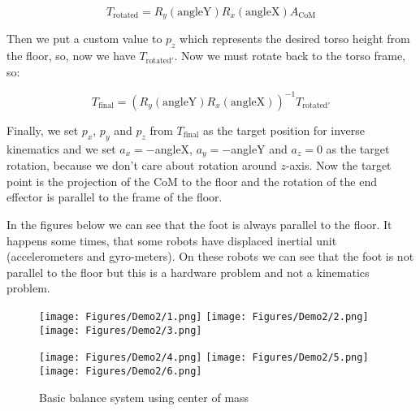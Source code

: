 \[
	T_{\text{rotated}} = R_y(\text{angleY})R_x(\text{angleX})A_{\text{CoM}}
\]

Then we put a custom value to $p_z$ which represents the desired torso height from the floor, so, now we have $T_{\text{rotated}'}$. Now we must rotate back to the torso frame, so:

\[
	T_{\text{final}} = \left(R_y(\text{angleY})R_x(\text{angleX})\right)^{-1}T_{\text{rotated}'}
\]

Finally, we set  $p_x$, $p_y$ and $p_z$ from $T_{\text{final}}$ as the target position for inverse kinematics and we set $a_x = -$angleX, $a_y = -$angleY and $a_z = 0$ as the target rotation, because we don't care about rotation around $z$-axis. Now the target point is the projection of the CoM to the floor and the rotation of the end effector is parallel to the frame of the floor.

In the figures below we can see that the foot is always parallel to the floor. It happens some times, that some robots have displaced inertial unit (accelerometers and gyro-meters). On these robots we can see that the foot is not parallel to the floor but this is a hardware problem and not a kinematics problem.

\begin{figure}[!h]
\centerline{
\texttt{[image: Figures/Demo2/1.png]}
\texttt{[image: Figures/Demo2/2.png]}
\texttt{[image: Figures/Demo2/3.png]}
}
\vspace*{0.06cm}
\centerline{
\texttt{[image: Figures/Demo2/4.png]}
\texttt{[image: Figures/Demo2/5.png]}
\texttt{[image: Figures/Demo2/6.png]}
}
\vspace{-0.1cm}
\caption{Basic balance system using center of mass}
\label{demo1}
\vspace*{0.5cm}
\end{figure}
